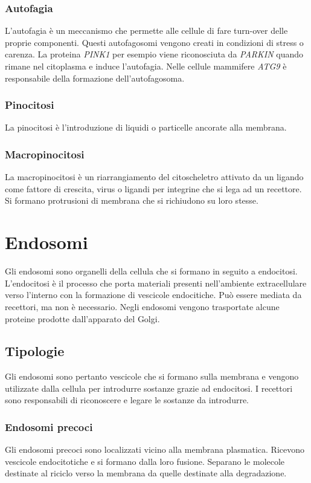 		\subsubsection{Autofagia}
		L'autofagia \`e un meccanismo che permette alle cellule di fare turn-over delle proprie componenti.
		Questi autofagosomi vengono creati in condizioni di stress o carenza.
		La proteina \emph{PINK1} per esempio viene riconosciuta da \emph{PARKIN} quando rimane nel citoplasma e induce l'autofagia.
		Nelle cellule mammifere \emph{ATG9} \`e responsabile della formazione dell'autofagosoma.

		\subsubsection{Pinocitosi}
		La pinocitosi \`e l'introduzione di liquidi o particelle ancorate alla membrana.

		\subsubsection{Macropinocitosi}
		La macropinocitosi \`e un riarrangiamento del citoscheletro attivato da un ligando come fattore di crescita, virus o ligandi per integrine che si lega ad un recettore.
		Si formano protrusioni di membrana che si richiudono su loro stesse.

\section{Endosomi}
Gli endosomi sono organelli della cellula che si formano in seguito a endocitosi.
L'endocitosi \`e il processo che porta materiali presenti nell'ambiente extracellulare verso l'interno con la formazione di vescicole endocitiche.
Pu\`o essere mediata da recettori, ma non \`e necessario.
Negli endosomi vengono trasportate alcune proteine prodotte dall'apparato del Golgi.

	\subsection{Tipologie}
	Gli endosomi sono pertanto vescicole che si formano sulla membrana e vengono utilizzate dalla cellula per introdurre sostanze grazie ad endocitosi.
	I recettori sono responsabili di riconoscere e legare le sostanze da introdurre.

		\subsubsection{Endosomi precoci}
		Gli endosomi precoci sono localizzati vicino alla membrana plasmatica.
		Ricevono vescicole endocitotiche e si formano dalla loro fusione.
		Separano le molecole destinate al riciclo verso la membrana da quelle destinate alla degradazione.
		
